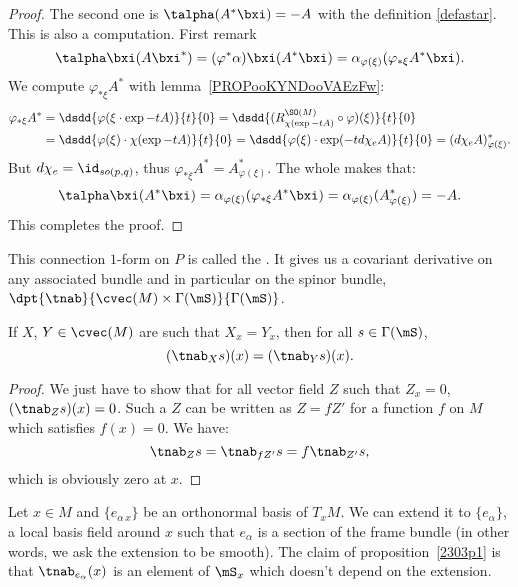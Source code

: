 \begin{proof}
	The second one is $\talpha(A^*\bxi)=-A$ with the definition \eqref{defastar}. This is also a computation. First remark
	\[
		\talpha\bxi(A\bxi^*)=(\varphi^*\alpha)\bxi(A^*\bxi)=\alpha_{\varphi(\xi)}(\varphi_{*\xi}A^*\bxi).
	\]
	We compute $\varphi_{*\xi}A^*$ with lemma~\ref{PROPooKYNDooVAEzFw}:
	\begin{equation}
		\begin{split}
			\varphi_{*\xi}A^*&=\dsdd{\varphi(\xi\cdot\exp -tA)}{t}{0} =\dsdd{(R_{\chi(\exp -tA)}^{\SO(M)}\circ\varphi)(\xi)}{t}{0}\\
			&=\dsdd{\varphi(\xi)\cdot\chi(\exp -tA)}{t}{0}=\dsdd{\varphi(\xi)\cdot\exp(-td\chi_eA)}{t}{0}=(d\chi_eA)^*_{\varphi(\xi)}.
		\end{split}
	\end{equation}
	But $d\chi_e=\id_{so(p,q)}$, thus $\varphi_{*\xi}A^*=A^*_{\varphi(\xi)}$. The whole makes that:
	\[
		\talpha\bxi(A^*\bxi)=\alpha_{\varphi(\xi)}(\varphi_{*\xi}A^*\bxi)=\alpha_{\varphi(\xi)}(A^*_{\varphi(\xi)})=-A.
	\]
	This completes the proof.
\end{proof}

\begin{definition}
	This connection $1$-form on $P$ is called the . It gives us a covariant derivative on any associated bundle and in particular on the spinor bundle, $\dpt{\tnab}{\cvec(M)\times\Gamma(\mS)}{\Gamma(\mS)}$.
	\label{spinconn}
\end{definition}

\begin{proposition}
	If $X$, $Y\in\cvec(M)$ are such that $X_x=Y_x$, then for all $s\in\Gamma(\mS)$,
	\[
		(\tnab_Xs)(x)=(\tnab_Ys)(x).
	\]
	\label{2303p1}
\end{proposition}
\begin{proof}
	We just have to show that for all vector field $Z$ such that $Z_x=0$, $(\tnab_Zs)(x)=0$. Such a $Z$ can be written as $Z=fZ'$ for a function $f$ on $M$ which satisfies $f(x)=0$. We have:
	\[
		\tnab_Zs=\tnab_{fZ'}s=f\tnab_{Z'}s,
	\]
	which is obviously zero at $x$.
\end{proof}

Let $x\in M$ and $\{e_{\alpha\,x}\}$ be an orthonormal basis of $T_xM$. We can extend it to $\{e_{\alpha}\}$, a local basis field around $x$ such that $e_{\alpha}$ is a section of the frame bundle (in other words, we ask the extension to be smooth). The claim of proposition~\ref{2303p1} is that $\tnab_{e_{\alpha}}(x)$ is an element of $\mS_x$ which doesn't depend on the extension.

